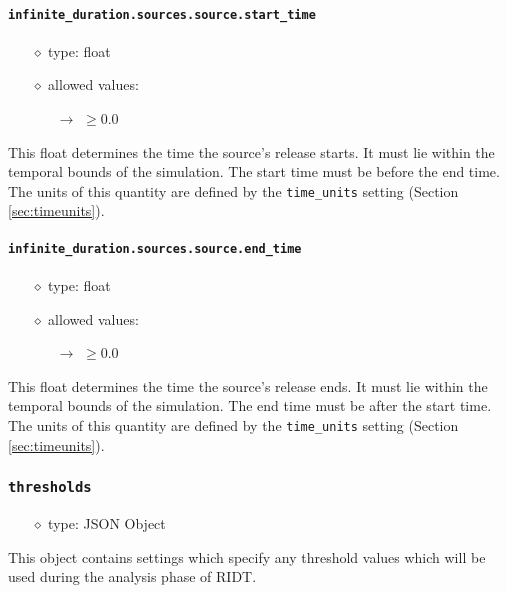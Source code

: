 \documentclass[]{article}
\def\code#1{\texttt{#1}}
\begin{document}
\paragraph{\code{infinite\_duration.sources.source.start\_time}}\label{sec:infsourcestarttime}
\begin{itemize}
    \item[$\diamond$] type: float 
    \item[$\diamond$] allowed values:
    \begin{itemize}
        \item[$\rightarrow$] $\geq0.0$
    \end{itemize}
\end{itemize}
This float determines the time the source's release starts. It must lie within
the temporal bounds of the simulation. The start time must be before the end
time. The units of this quantity are defined by the \code{time\_units} setting
(Section \ref{sec:timeunits}).


\paragraph{\code{infinite\_duration.sources.source.end\_time}}\label{sec:infsourceendtime}
\begin{itemize}
    \item[$\diamond$] type: float 
    \item[$\diamond$] allowed values:
    \begin{itemize}
        \item[$\rightarrow$] $\geq0.0$
    \end{itemize}
\end{itemize}
This float determines the time the source's release ends. It must lie within
the temporal bounds of the simulation. The end time must be after the start 
time. The units of this quantity are defined by the \code{time\_units} setting
(Section \ref{sec:timeunits}).

\subsubsection{\code{thresholds}}

\begin{itemize}
    \item[$\diamond$] type: JSON Object 
\end{itemize}
This object contains settings which specify any threshold values which will be
used during the analysis phase of RIDT. 
\end{document}
